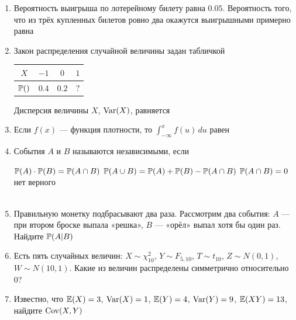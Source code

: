 \documentclass[12pt, a4paper]{article}\usepackage[]{graphicx}\usepackage[]{color}
\begin{document}
				\begin{enumerate}


					\item Вероятность выигрыша по лотерейному билету равна $0.05$. Вероятность того, что из трёх купленных билетов ровно два окажутся выигрышными примерно равна


					\item Закон распределения случайной величины задан табличкой

					\begin{tabular}{c|ccc}
						$X$ & $-1$ & $0$ & $1$ \\
						\hline
						$\P()$ & $0.4$ & $0.2$ & $?$ \\
					\end{tabular}

					Дисперсия величины $X$, $\Var(X)$, равняется


					\item Если $f(x)$ — функция плотности, то $\int_{-\infty}^{x}f(u)\,du$ равен


					\item События $A$ и $B$ называются независимыми, если

					{$\P(A)\cdot\P(B)=\P(A\cap B)$}
					{$\P(A\cup B)=\P(A)+\P(B)-\P(A\cap B)$}
					{$\P(A\cap B)=0$}
					{нет верного} \\ \\

					\item Правильную монетку подбрасывают два раза. Рассмотрим два события: $A$ — при втором броске выпала «решка», $B$ — «орёл» выпал хотя бы один раз. Найдите $\P(A|B)$


					\item Есть пять случайных величин: $X\sim \chi^2_{10}$, $Y\sim F_{5,10}$, $T\sim t_{10}$, $Z\sim N(0,1)$, $W\sim N(10,1)$. Какие из величин распределены симметрично относительно 0?


					\item Известно, что $\E(X)=3$, $\Var(X)=1$, $\E(Y)=4$, $\Var(Y)=9$, $\E(XY)=13$, найдите $\Cov(X,Y)$


\end{enumerate}
\end{document}
